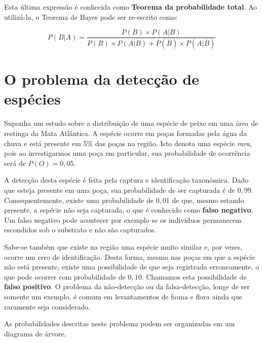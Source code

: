 \documentclass[
]{book}
\begin{document}
Esta última expressão é conhecida como \textbf{Teorema da probabilidade total}. Ao utilizá-la, o Teorema de Bayes pode ser re-escrito como:

\[P(B|A) = \frac{P(B) \times P(A|B)}{P(B) \times P(A|B) + P(\overline{B}) \times P(A|\overline{B})}\]

\hypertarget{o-problema-da-detecuxe7uxe3o-de-espuxe9cies}{%
\section{O problema da detecção de espécies}\label{o-problema-da-detecuxe7uxe3o-de-espuxe9cies}}

Suponha um estudo sobre a distribuição de uma espécie de peixe em uma área de restinga da Mata Atlântica. A espécie ocorre em poças formadas pela água da chuva e está presente em 5\% das poças na região. Isto denota uma espécie \emph{rara}, pois ao investigarmos uma poça em particular, sua probabilidade de ocorrência será de \(P(O) = 0,05\).

A detecção desta espécie é feita pela captura e identificação taxonômica. Dado que esteja presente em uma poça, sua probabilidade de ser capturada é de \(0,99\). Consequentemente, existe uma probabilidade de \(0,01\) de que, mesmo estando presente, a espécie não seja capturada, o que é conhecido como \textbf{falso negativo}. Um falso negativo pode acontecer por exemplo se os indivíduos permanecem escondidos sob o substrato e não são capturados.

Sabe-se também que existe na região uma espécie muito similar e, por vezes, ocorre um erro de identificação. Desta forma, mesmo nas poças em que a espécie não está presente, existe uma possibilidade de que seja registrada erroneamente, o que pode ocorrer com probabilidade de \(0,10\). Chamamos esta possibilidade de \textbf{falso positivo}. O problema da não-detecção ou da falsa-detecção, longe de ser somente um exemplo, é comum em levantamentos de fauna e flora ainda que raramente seja considerado.

As probabilidades descritas neste problema podem ser organizadas em um diagrama de árvore.
\end{document}
